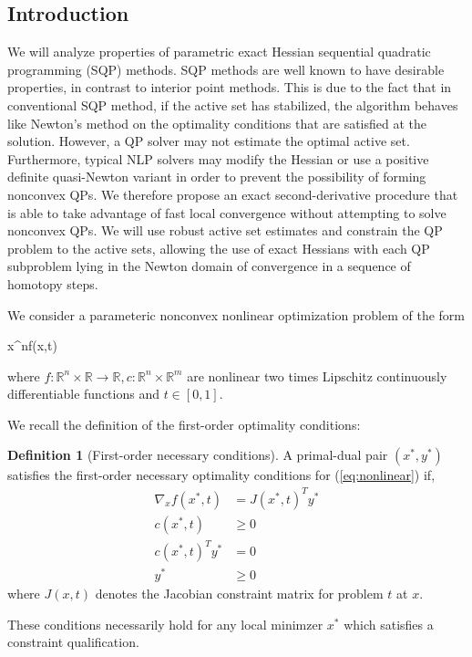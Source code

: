 \documentclass{article}
\theoremstyle{example}
\theoremstyle{definition}
\newtheorem{definition}{Definition}[section]
\theoremstyle{assumption}
\theoremstyle{lemma}
\begin{document}
\subsection{Introduction}
We will analyze properties of parametric exact Hessian sequential quadratic programming (SQP) methods.
SQP methods are well known to have desirable properties, in contrast to interior point methods.
This is due to the fact that in conventional SQP method, if the active set has stabilized, the algorithm behaves like Newton's method on the optimality conditions that are satisfied at the solution.
However, a QP solver may not estimate the optimal active set.
Furthermore, typical NLP solvers may modify the Hessian or use a positive definite quasi-Newton variant in order to prevent the possibility of forming nonconvex QPs.
We therefore propose an exact second-derivative procedure that is able to take advantage of fast local convergence without attempting to solve nonconvex QPs.
We will use robust active set estimates and constrain the QP problem to the active sets, allowing the use of exact Hessians with each QP subproblem lying in the Newton domain of convergence in a sequence of homotopy steps.
\par
We consider a parameteric nonconvex nonlinear optimization problem of the form
\begin{mini!}
	{x\in{}^n}{f(x,t)}{}{}
	\label{eq:nonlinear}
\end{mini!}
where $f:\mathbb{R}^n\times\mathbb{R}\rightarrow\mathbb{R},c:\mathbb{R}^n\times\mathbb{R}^m$ are nonlinear two times Lipschitz continuously differentiable functions and $t\in[0,1]$.
\par
We recall the definition of the first-order optimality conditions:
\begin{definition}[First-order necessary conditions]
	A primal-dual pair $(x^*,y^*)$ satisfies the first-order necessary optimality conditions for (\ref{eq:nonlinear}) if,
	\begin{align}
		\nabla_xf(x^*,t)&=J(x^*,t)^Ty^*\nonumber\\
		c(x^*,t)&\geq 0\nonumber\\
		c(x^*,t)^Ty^*&=0\nonumber\\
		y^*&\geq 0
		\label{eq:KKT}
	\end{align}
where $J(x,t)$ denotes the Jacobian constraint matrix for problem $t$ at $x$.
\end{definition}
These conditions necessarily hold for any local minimzer $x^*$ which satisfies a constraint qualification.
\end{document}
